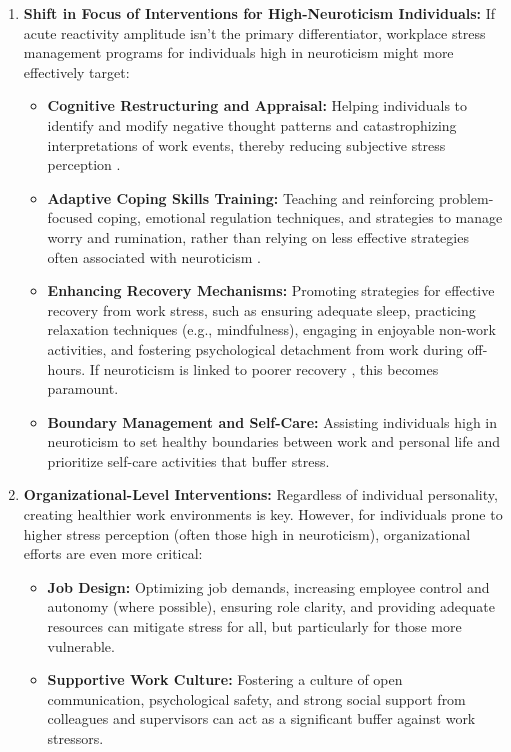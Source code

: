 \documentclass[11pt, a4paper]{report}
\begin{document}
\begin{enumerate}
    \item \textbf{Shift in Focus of Interventions for High-Neuroticism Individuals:}
        If acute reactivity amplitude isn't the primary differentiator, workplace stress management programs for individuals high in neuroticism might more effectively target:
        \begin{itemize}
            \item \textbf{Cognitive Restructuring and Appraisal:} Helping individuals to identify and modify negative thought patterns and catastrophizing interpretations of work events, thereby reducing subjective stress perception \cite{LazarusFolkman1984}.
            \item \textbf{Adaptive Coping Skills Training:} Teaching and reinforcing problem-focused coping, emotional regulation techniques, and strategies to manage worry and rumination, rather than relying on less effective strategies often associated with neuroticism \cite{ConnorSmithFlachsbart2007}.
            \item \textbf{Enhancing Recovery Mechanisms:} Promoting strategies for effective recovery from work stress, such as ensuring adequate sleep, practicing relaxation techniques (e.g., mindfulness), engaging in enjoyable non-work activities, and fostering psychological detachment from work during off-hours. If neuroticism is linked to poorer recovery \cite{ChidaHamer2008}, this becomes paramount.
            \item \textbf{Boundary Management and Self-Care:} Assisting individuals high in neuroticism to set healthy boundaries between work and personal life and prioritize self-care activities that buffer stress.
        \end{itemize}
    \item \textbf{Organizational-Level Interventions:}
        Regardless of individual personality, creating healthier work environments is key. However, for individuals prone to higher stress perception (often those high in neuroticism), organizational efforts are even more critical:
        \begin{itemize}
            \item \textbf{Job Design:} Optimizing job demands, increasing employee control and autonomy (where possible), ensuring role clarity, and providing adequate resources can mitigate stress for all, but particularly for those more vulnerable.
            \item \textbf{Supportive Work Culture:} Fostering a culture of open communication, psychological safety, and strong social support from colleagues and supervisors can act as a significant buffer against work stressors.

\end{itemize}
\end{enumerate}
\end{document}
